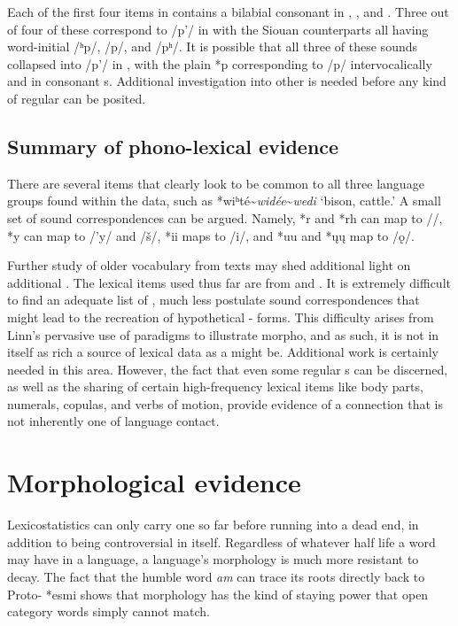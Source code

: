 \documentclass[output=paper]{LSP/langsci}
\begin{document}
\largerpage[-1]
Each of the first four items in  contains a bilabial consonant in , , and . Three out of four of these correspond to /p'/ in  with the Siouan counterparts all having word-initial /ʰp/, /p/, and /pʰ/. It is possible that all three of these sounds collapsed into /p'/ in , with the plain *p corresponding to  /p/ intervocalically and in consonant s. Additional investigation into other  is needed before any kind of regular  can be posited.

\subsection{Summary of phono-lexical evidence}

\largerpage[-1]
There are several items that clearly look to be common to all three language groups found within the data, such as *wiʰté{\textasciitilde}\emph{widée}{\textasciitilde}\emph{wedi} `bison, cattle.' A small set of sound correspondences can be argued. Namely, *r and *rh can map to /\textbeltl/, *y can map to /'y/ and /\v{s}/, *ii maps to /i/, and *uu and *\k{u}\k{u} map to /\k{o}/. 

Further study of older vocabulary from  texts may shed additional light on additional . The lexical items used thus far are from \citet{Linn2000} and \citet{Rankinetal2015AccessSeptember}. It is extremely difficult to find an adequate list of , much less postulate sound correspondences that might lead to the recreation of hypothetical - forms. This difficulty arises from Linn's pervasive use of paradigms to illustrate  morpho, and as such, it is not in itself as rich a source of lexical data as a  might be. Additional work is certainly needed in this area. However, the fact that even some regular s can be discerned, as well as the sharing of certain high-frequency lexical items like body parts, numerals, copulas, and verbs of motion, provide evidence of a connection that is not inherently one of language contact.

\section{Morphological evidence}\label{sec:kasak:5}

Lexicostatistics can only carry one so far before running into a dead end, in addition to being controversial in itself. Regardless of whatever half life a word may have in a language, a language's morphology is much more resistant to decay. The fact that the humble  word \textit{am} can trace its roots directly back to Proto- *esmi shows that morphology has the kind of staying power that open category words simply cannot match.
\end{document}
